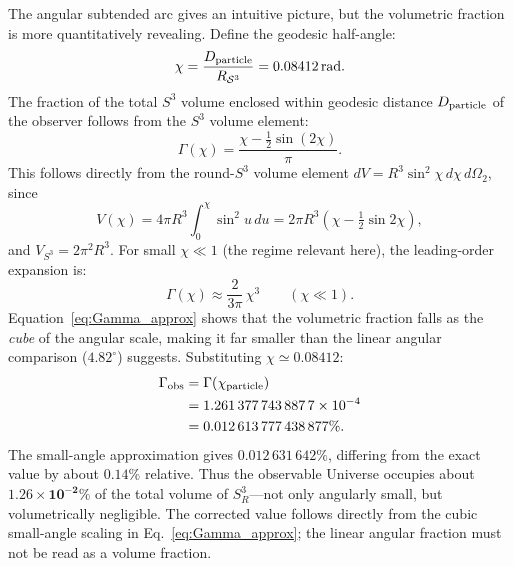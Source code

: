 \documentclass[aps,prd,onecolumn,superscriptaddress,longbibliography,nofootinbib,notitlepage]{revtex4-2}
\begin{document}
The angular subtended arc gives an intuitive picture, but the volumetric fraction
is more quantitatively revealing. Define the geodesic half-angle:
\begin{equation}
  \chi = \frac{D_{\rm particle}}{R_{\mathcal{S}^3}}
       = 0.08412\,\mathrm{rad}.
\end{equation}
The fraction of the total $S^3$ volume enclosed within geodesic distance
$D_{\rm particle}$ of the observer follows from the $S^3$ volume element:
\begin{equation}
  \Gamma(\chi)
  = \frac{\chi - \tfrac{1}{2}\sin(2\chi)}{\pi}.
  \label{eq:Gamma_chi}
\end{equation}
This follows directly from the round-$S^3$ volume element
$dV=R^3\sin^2\chi\,d\chi\,d\Omega_2$, since
\begin{equation}
  V(\chi)=4\pi R^3\int_0^\chi\sin^2 u\,du
  =2\pi R^3\left(\chi-\tfrac12\sin 2\chi\right),
\end{equation}
and $V_{S^3}=2\pi^2R^3$. For small $\chi \ll 1$ (the regime relevant here),
the leading-order expansion is:
\begin{equation}
  \Gamma(\chi) \approx \frac{2}{3\pi}\,\chi^3
  \qquad (\chi \ll 1).
  \label{eq:Gamma_approx}
\end{equation}
Equation~\eqref{eq:Gamma_approx} shows that the volumetric fraction falls as the
\emph{cube} of the angular scale, making it far smaller than the linear angular
comparison ($4.82^\circ$) suggests. Substituting $\chi \simeq 0.08412$:
\begin{equation}
\begin{aligned}
  \Gamma_{\rm obs}
  &= \Gamma(\chi_{\rm particle}) \\
  &= 1.261\,377\,743\,887\,7\times10^{-4} \\
  &= 0.012\,613\,777\,438\,877\%.
\end{aligned}
\end{equation}
The small-angle approximation gives $0.012\,631\,642\%$, differing from the exact
value by about $0.14\%$ relative. Thus the observable Universe occupies about
$\mathbf{1.26\times10^{-2}\%}$ of
the total volume of $S^3_R$---not only angularly small, but volumetrically
negligible. The corrected value follows directly from the cubic small-angle
scaling in Eq.~\eqref{eq:Gamma_approx}; the linear angular fraction must not be
read as a volume fraction.
\end{document}
